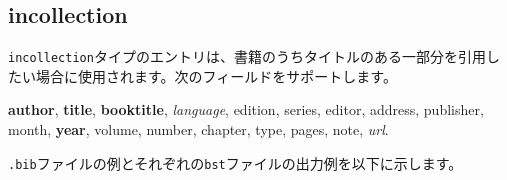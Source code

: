 \documentclass[10pt, a4paper]{jsarticle}
\renewcommand{\refname}{\small 参考文献}
\newcommand{\putlst}[1]{
  \noindent\makebox[\linewidth]{\rule{\linewidth}{0.4pt}}\vspace{-1.5zw}
  \vspace{-1.8zw}
  \noindent\makebox[\linewidth]{\rule{\linewidth}{0.4pt}}\vspace{0.5zw}\par
}
\begin{document}
\begin{bibunit}[IEEJtran]
  \nocite{Inproceedings,jpInproceedings1,enInproceedings1,jpInproceedings2,enInproceedings2}
  \renewcommand{\refname}{\small 参考文献(IEEJtran.bst)}
  {\small \putbib[./inproceedings]}
\end{bibunit}
\begin{bibunit}[jIEEEtran]
  \nocite{Inproceedings,jpInproceedings1,enInproceedings1,jpInproceedings2,enInproceedings2}
  \renewcommand{\refname}{\small 参考文献(jIEEEtran.bst)}
  {\small \putbib[./inproceedings]}
\end{bibunit}
\begin{bibunit}[IEEJtran]
  \nocite{jpInproceedings1/ej/enInproceedings1,jpInproceedings2/ej/enInproceedings2}
  \renewcommand{\refname}{\small 英日を併記した参考文献(IEEJtran.bst)}
  {\small \putbib[./inproceedings]}
\end{bibunit}
\begin{bibunit}[jIEEEtran]
  \nocite{jpInproceedings1/ej/enInproceedings1,jpInproceedings2/ej/enInproceedings2}
  \renewcommand{\refname}{\small 英日を併記した参考文献(jIEEEtran.bst)}
  {\small \putbib[./inproceedings]}
\end{bibunit}



\subsection{incollection}

\texttt{incollection}タイプのエントリは、書籍のうちタイトルのある一部分を引用したい場合に使用されます。次のフィールドをサポートします。

\begin{center}
  \textbf{author}, \textbf{title}, \textbf{booktitle}, \textsl{language}, edition, series, editor, address, publisher, \\
  month, \textbf{year}, volume, number, chapter, type, pages, note, \textsl{url}.
\end{center}

\texttt{.bib}ファイルの例とそれぞれの\texttt{bst}ファイルの出力例を以下に示します。

\putlst{incollection.bib}
\end{document}
